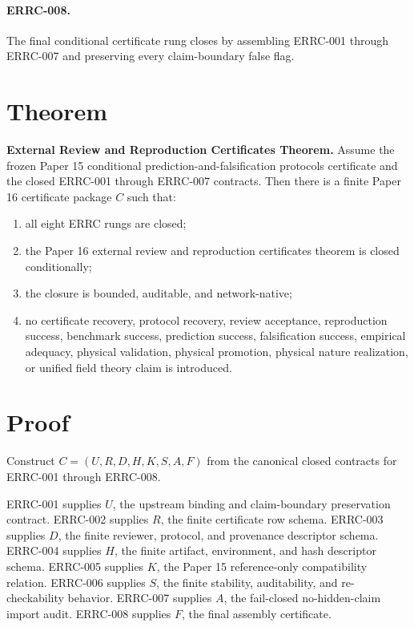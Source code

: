 \documentclass{article}
\begin{document}
\paragraph{ERRC-008.}
The final conditional certificate rung closes by assembling ERRC-001 through
ERRC-007 and preserving every claim-boundary false flag.

\section{Theorem}

\textbf{External Review and Reproduction Certificates Theorem.}
Assume the frozen Paper 15 conditional prediction-and-falsification protocols
certificate and the closed ERRC-001 through ERRC-007 contracts. Then there is
a finite Paper 16 certificate package \(C\) such that:

\begin{enumerate}
\item all eight ERRC rungs are closed;
\item the Paper 16 external review and reproduction certificates theorem is
closed conditionally;
\item the closure is bounded, auditable, and network-native;
\item no certificate recovery, protocol recovery, review acceptance,
reproduction success, benchmark success, prediction success, falsification
success, empirical adequacy, physical validation, physical promotion,
physical nature realization, or unified field theory claim is introduced.
\end{enumerate}

\section{Proof}

Construct \(C=(U,R,D,H,K,S,A,F)\) from the canonical closed contracts for
ERRC-001 through ERRC-008.

ERRC-001 supplies \(U\), the upstream binding and claim-boundary preservation
contract. ERRC-002 supplies \(R\), the finite certificate row schema. ERRC-003
supplies \(D\), the finite reviewer, protocol, and provenance descriptor
schema. ERRC-004 supplies \(H\), the finite artifact, environment, and hash
descriptor schema. ERRC-005 supplies \(K\), the Paper 15 reference-only
compatibility relation. ERRC-006 supplies \(S\), the finite stability,
auditability, and re-checkability behavior. ERRC-007 supplies \(A\), the
fail-closed no-hidden-claim import audit. ERRC-008 supplies \(F\), the final
assembly certificate.
\end{document}
